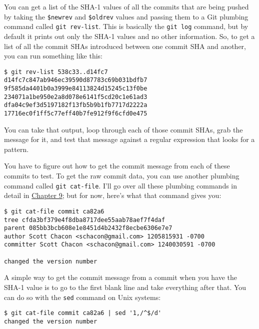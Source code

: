 \documentclass[a4paper]{book}
\newcommand{\prechap}{Chapter }
\newcommand{\postchap}{}
\newcommand{\chapref}[1]{\hyperref[chap:#1]{\prechap #1\postchap}}
\begin{document}
You can get a list of the SHA-1 values of all the commits that are being pushed by taking the \texttt{\$newrev} and \texttt{\$oldrev} values and passing them to a Git plumbing command called \texttt{git rev-list}. This is basically the \texttt{git log} command, but by default it prints out only the SHA-1 values and no other information. So, to get a list of all the commit SHAs introduced between one commit SHA and another, you can run something like this:

\begin{shaded}\begin{verbatim}
$ git rev-list 538c33..d14fc7
d14fc7c847ab946ec39590d87783c69b031bdfb7
9f585da4401b0a3999e84113824d15245c13f0be
234071a1be950e2a8d078e6141f5cd20c1e61ad3
dfa04c9ef3d5197182f13fb5b9b1fb7717d2222a
17716ec0f1ff5c77eff40b7fe912f9f6cfd0e475
\end{verbatim}\end{shaded}

You can take that output, loop through each of those commit SHAs, grab the message for it, and test that message against a regular expression that looks for a pattern.

You have to figure out how to get the commit message from each of these commits to test. To get the raw commit data, you can use another plumbing command called \texttt{git cat-file}. I'll go over all these plumbing commands in detail in \chapref{9}; but for now, here's what that command gives you:

\begin{shaded}\begin{verbatim}
$ git cat-file commit ca82a6
tree cfda3bf379e4f8dba8717dee55aab78aef7f4daf
parent 085bb3bcb608e1e8451d4b2432f8ecbe6306e7e7
author Scott Chacon <schacon@gmail.com> 1205815931 -0700
committer Scott Chacon <schacon@gmail.com> 1240030591 -0700

changed the version number
\end{verbatim}\end{shaded}

A simple way to get the commit message from a commit when you have the SHA-1 value is to go to the first blank line and take everything after that. You can do so with the \texttt{sed} command on Unix systems:

\begin{shaded}\begin{verbatim}
$ git cat-file commit ca82a6 | sed '1,/^$/d'
changed the version number
\end{verbatim}\end{shaded}
\end{document}
